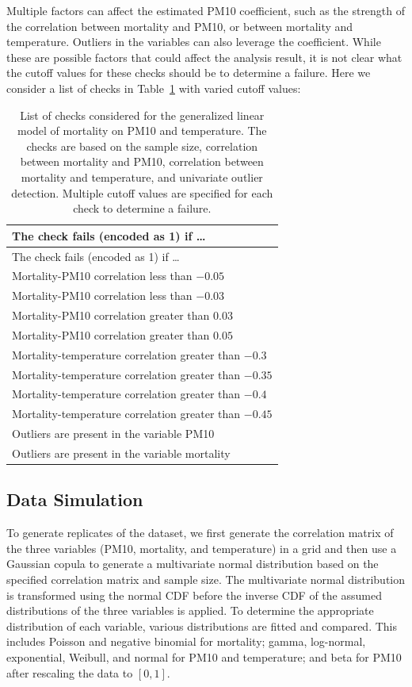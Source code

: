 \documentclass[
  12pt,
]{interact}
\begin{document}
Multiple factors can affect the estimated PM10 coefficient, such as the
strength of the correlation between mortality and PM10, or between
mortality and temperature. Outliers in the variables can also leverage
the coefficient. While these are possible factors that could affect the
analysis result, it is not clear what the cutoff values for these checks
should be to determine a failure. Here we consider a list of checks in
Table~\ref{tbl-checks} with varied cutoff values:

\begin{longtable}[]{@{}l@{}}
\caption{List of checks considered for the generalized linear model of
mortality on PM10 and temperature. The checks are based on the sample
size, correlation between mortality and PM10, correlation between
mortality and temperature, and univariate outlier detection. Multiple
cutoff values are specified for each check to determine a
failure.}\label{tbl-checks}\tabularnewline
\toprule\noalign{}
The check fails (encoded as 1) if \ldots{} \\
\midrule\noalign{}
\endfirsthead
\toprule\noalign{}
The check fails (encoded as 1) if \ldots{} \\
\midrule\noalign{}
\endhead
\bottomrule\noalign{}
\endlastfoot
Mortality-PM10 correlation less than \(-0.05\) \\
Mortality-PM10 correlation less than \(-0.03\) \\
Mortality-PM10 correlation greater than \(0.03\) \\
Mortality-PM10 correlation greater than \(0.05\) \\
Mortality-temperature correlation greater than \(-0.3\) \\
Mortality-temperature correlation greater than \(-0.35\) \\
Mortality-temperature correlation greater than \(-0.4\) \\
Mortality-temperature correlation greater than \(-0.45\) \\
Outliers are present in the variable PM10 \\
Outliers are present in the variable mortality \\
\end{longtable}

\subsection{Data Simulation}\label{data-simulation}

To generate replicates of the dataset, we first generate the correlation
matrix of the three variables (PM10, mortality, and temperature) in a
grid and then use a Gaussian copula to generate a multivariate normal
distribution based on the specified correlation matrix and sample size.
The multivariate normal distribution is transformed using the normal CDF
before the inverse CDF of the assumed distributions of the three
variables is applied. To determine the appropriate distribution of each
variable, various distributions are fitted and compared. This includes
Poisson and negative binomial for mortality; gamma, log-normal,
exponential, Weibull, and normal for PM10 and temperature; and beta for
PM10 after rescaling the data to \([0,1]\).
\end{document}
